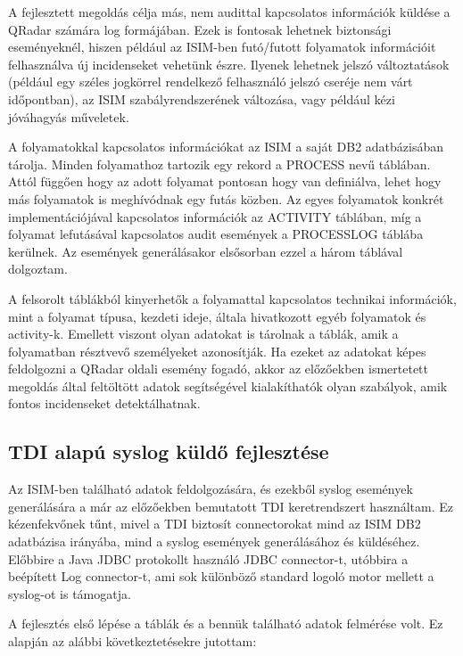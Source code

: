 A fejlesztett megoldás célja más, nem audittal kapcsolatos információk küldése a QRadar számára log formájában. Ezek is fontosak lehetnek biztonsági eseményeknél, hiszen például az ISIM-ben futó/futott folyamatok információit felhasználva új incidenseket vehetünk észre. Ilyenek lehetnek jelszó változtatások (például egy széles jogkörrel rendelkező felhasználó jelszó cseréje nem várt időpontban), az ISIM szabályrendszerének változása, vagy például kézi jóváhagyás műveletek. 

A folyamatokkal kapcsolatos információkat az ISIM a saját DB2 adatbázisában tárolja. Minden folyamathoz tartozik egy rekord a PROCESS nevű táblában. Attól függően hogy az adott folyamat pontosan hogy van definiálva, lehet hogy más folyamatok is meghívódnak egy futás közben. Az egyes folyamatok konkrét implementációjával kapcsolatos információk az ACTIVITY táblában, míg a folyamat lefutásával kapcsolatos audit események a PROCESSLOG táblába kerülnek. Az események generálásakor elsősorban ezzel a három táblával dolgoztam.

A felsorolt táblákból kinyerhetők a folyamattal kapcsolatos technikai információk, mint a folyamat típusa, kezdeti ideje, általa hivatkozott egyéb folyamatok és activity-k. Emellett viszont olyan adatokat is tárolnak a táblák, amik a folyamatban résztvevő személyeket azonosítják. Ha ezeket az adatokat képes feldolgozni a QRadar oldali esemény fogadó, akkor az előzőekben ismertetett megoldás által feltöltött adatok segítségével kialakíthatók olyan szabályok, amik fontos incidenseket detektálhatnak.
 
\subsection{TDI alapú syslog küldő fejlesztése}
Az ISIM-ben található adatok feldolgozására, és ezekből syslog események generálására a már az előzőekben bemutatott TDI keretrendszert használtam. Ez kézenfekvőnek tűnt, mivel a TDI biztosít connectorokat mind az ISIM DB2 adatbázisa irányába, mind a syslog események generálásához és küldéséhez. Előbbire a Java JDBC protokollt használó JDBC connector-t, utóbbira a beépített Log connector-t, ami sok különböző standard logoló motor mellett a syslog-ot is támogatja. 

A fejlesztés első lépése a táblák és a bennük található adatok felmérése volt. Ez alapján az alábbi következtetésekre jutottam:

